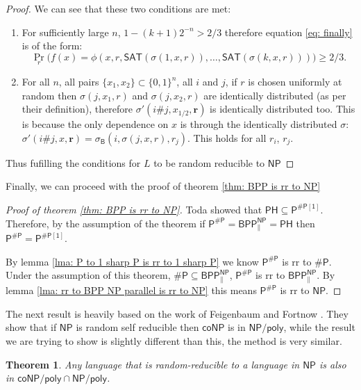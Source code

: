 \documentclass[10pt,a4paper]{article}
\newtheorem{theorem}{Theorem}
\begin{document}
\begin{proof}
We can see that these two conditions are met: 

\begin{enumerate}[label={(\arabic*)}]
        \item For sufficiently large $n$, $1-(k+1)2^{-n}>2/3$ therefore equation \ref{eq: finally} is of the form:
            \[
            \Pr_{r}\big(
            f(x)=\phi(x,r,\mathsf{SAT}(\sigma(1,x,r)),\ldots, \mathsf{SAT}(\sigma(k, x, r)))
            \big)\geq2/3.
            \]
        \item For all $n$, all pairs $\{x_1,x_2\}\subset \{0,1\}^n$, all $i$ and $j$, if $r$ is chosen uniformly at random then $\sigma(j,x_1,r)$ and $\sigma(j,x_2,r)$ are identically distributed (as per their definition), therefore $\sigma'(i\#j,x_{1/2},\mathbf{r})$ is identically distributed too. This is because the only dependence on $x$ is through the identically distributed $\sigma$: $\sigma'(i\#j,x,\mathbf{r})= \sigma_\mathsf{B}(i, \sigma(j, x, r), r_j)$. This holds for all $r_i$, $r_j$. 
    \end{enumerate}
Thus fufilling the conditions for $L$ to be random reducible to $\mathsf{NP}$
\end{proof}

Finally, we can proceed with the proof of theorem \ref{thm: BPP is rr to NP}

\begin{proof}[Proof of theorem \ref{thm: BPP is rr to NP}]
Toda \cite{toda1991pp} showed that $\mathsf{PH\subseteq P^{\# P[1]}}$. Therefore, by the assumption of the theorem if $\mathsf{P^{\# P}= BPP_{\parallel}^{NP}=PH}$ then $\mathsf{P^{\# P} = P^{\# P[1]}}$. 

By lemma \ref{lma: P to 1 sharp P is rr to 1 sharp P} we know $\mathsf{P^{\# P}}$ is rr to $\mathsf{\# P}$. Under the assumption of this theorem, $\mathsf{\# P \subseteq BPP^{NP}_{\parallel}}$, $\mathsf{P^{\# P}}$ is rr to $\mathsf{BPP^{NP}_{\parallel}}$. By lemma \ref{lma: rr to BPP NP parallel is rr to NP} this means $\mathsf{P^{\# P}}$ is rr to $\mathsf{NP}$.
\end{proof}

The next result is heavily based on the work of Feigenbaum and Fortnow \cite{feigenbaum1990random}. They show that if $\mathsf{NP}$ is random self reducible then $\mathsf{coNP}$ is in $\mathsf{NP/poly}$, while the result we are trying to show is slightly different than this, the method is very similar.

\begin{theorem}\label{thm: rr to NP is NP/poly}
    Any language that is random-reducible to a language in $\mathsf{NP}$ is also in $\mathsf{coNP/poly \cap NP/poly}$.
\end{theorem}
\end{document}
